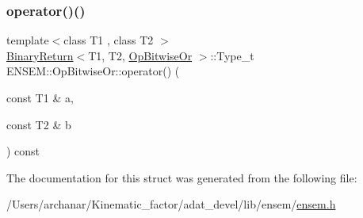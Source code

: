 \mbox{\label{structENSEM_1_1OpBitwiseOr_ad773d2df54ccbb80a46a0cd83b9ce226}} 
\subsubsection{\texorpdfstring{operator()()}{operator()()}\hspace{0.1cm}{\footnotesize\ttfamily [2/2]}}
{\footnotesize\ttfamily template$<$class T1 , class T2 $>$ \\
\mbox{\hyperlink{structENSEM_1_1BinaryReturn}{Binary\+Return}}$<$T1, T2, \mbox{\hyperlink{structENSEM_1_1OpBitwiseOr}{Op\+Bitwise\+Or}} $>$\+::Type\+\_\+t E\+N\+S\+E\+M\+::\+Op\+Bitwise\+Or\+::operator() (\begin{DoxyParamCaption}\item[{const T1 \&}]{a,  }\item[{const T2 \&}]{b }\end{DoxyParamCaption}) const\hspace{0.3cm}{\ttfamily [inline]}}



The documentation for this struct was generated from the following file\+:\begin{DoxyCompactItemize}
\item 
/\+Users/archanar/\+Kinematic\+\_\+factor/adat\+\_\+devel/lib/ensem/\mbox{\hyperlink{lib_2ensem_2ensem_8h}{ensem.\+h}}\end{DoxyCompactItemize}
